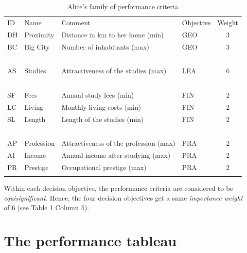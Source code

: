 \begin{table}[h]
\caption{Alice's family of performance criteria}
\label{tab:12.2}       %
\begin{center}
    \begin{tabular}{l|l|l|l|c}
      \svhline\noalign{\smallskip}
      ID & Name & Comment & Objective & Weight\\
      \noalign{\smallskip}\hline\noalign{\smallskip}
       DH  & Proximity  &  Distance in km to her home (min)      &   GEO    &     3\\
       BC  & Big City   &  Number of inhabitants (max)           &   GEO    &     3\\
       \   & \          &  \                                     &   \      &     \ \\
       AS  & Studies    &  Attractiveness of the studies (max)   &   LEA    &     6\\
       \   & \          &  \                                     &  \       &    \ \\
       SF  & Fees       &  Annual study fees (min)               &   FIN    &     2\\
       LC  & Living     &  Monthly living costs (min)            &   FIN    &     2\\
       SL  & Length     &  Length of the studies (min)           &   FIN    &     2\\
       \   &  \         &   \                                    &   \      &     \ \\
       AP  & Profession &  Attractiveness of the profession (max)&   PRA    &     2\\
       AI  & Income     &  Annual income after studying (max)    &   PRA    &     2\\
       PR  & Prestige   &  Occupational prestige (max)           &   PRA    &     2\\
      \noalign{\smallskip}\hline
    \end{tabular}
\end{center}
\end{table}

Within each decision objective, the performance criteria are considered to be \emph{equisignificant}. Hence, the four decision objectives get a same \emph{importance weight} of $6$ (see Table \ref{tab:12.2} Column 5).

\section{The performance tableau}
\label{sec:12.2}

